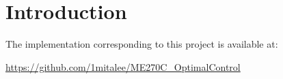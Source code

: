 \section{Introduction}
\label{sec:introduction}

The implementation corresponding to this project is available at:
\begin{center}
\url{https://github.com/1mitalee/ME270C_OptimalControl}
\end{center}

